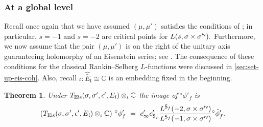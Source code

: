 \documentclass[11pt]{amsart}
\newtheorem{theorem}{Theorem}[section]
\newcommand{\sfv}{{\sf v}}
\begin{document}
\medskip
\subsubsection{At a global level}

Recall once again that we have assumed $(\mu,\mu')$ satisfies the conditions of \cite[Lem.\,7.14]{harder-raghuram}; in particular, 
$s = -1$ and $s = -2$ are critical points for $L(s, \sigma \times \sigma'^\sfv).$ Furthermore, we now assume that 
the pair $(\mu,\mu')$ is on the right of the unitary axis guaranteeing holomorphy of an Eisenstein series; see \cite[Thm.\,6.4]{harder-raghuram}.
The consequence of these conditions for the classical Rankin--Selberg $L$-functions were discussed in \ref{sec:set-up-eis-coh}. Also, recall $\iota: \hat{\bar{E}}_\mathfrak{l} \cong \mathbb{C}$ is an embedding fixed in the beginning.


\begin{theorem}
\label{thm: ratios-of-l-values}
	Under $T_{\textup{Eis}}(\sigma, \sigma',\epsilon',E_\mathfrak{l}) \otimes_{\iota}{\mathbb{C}}$  the image of ${^\circ}\phi'_f$ is
	\[ (T_{\textup{Eis}}(\sigma, \sigma',\epsilon',E_\mathfrak{l})\otimes_{\iota} \mathbb{C}) \,\,{^\circ}\phi'_f \ = \ 
	c'_\infty c'_{\mathsf{S}_f}
	\frac{L^{\mathsf{S}_f}(-2, \sigma \times \sigma'^\sfv)}
	{L^{\mathsf{S}_f}(-1, \sigma \times \sigma'^\sfv)} {^\circ}\tilde{\phi}_f'.\]
\end{theorem}
\end{document}
